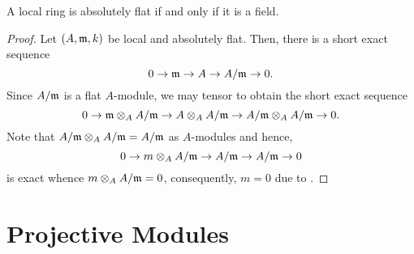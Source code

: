 \begin{proposition}
    A local ring is absolutely flat if and only if it is a field.
\end{proposition}
\begin{proof}
    Let $(A,\mathfrak m, k)$ be local and absolutely flat. Then, there is a short exact sequence 
    \begin{equation*}
        0\to\mathfrak m\to A\to A/\mathfrak m\to 0.
    \end{equation*}
    Since $A/\mathfrak m$ is a flat $A$-module, we may tensor to obtain the short exact sequence 
    \begin{equation*}
        0\to\mathfrak m\otimes_A A/\mathfrak m\to A\otimes_A A/\mathfrak m\to A/\mathfrak m\otimes_A A/\mathfrak m\to 0.
    \end{equation*}
    Note that $A/\mathfrak m\otimes_A A/\mathfrak m = A/\mathfrak m$ as $A$-modules and hence, 
    \begin{equation*}
        0\to m\otimes_A A/\mathfrak m\to A/\mathfrak m\to A/\mathfrak m\to 0
    \end{equation*}
    is exact whence $m\otimes_A A/\mathfrak m = 0$, consequently, $m = 0$ due to .
\end{proof}


\section{Projective Modules}

